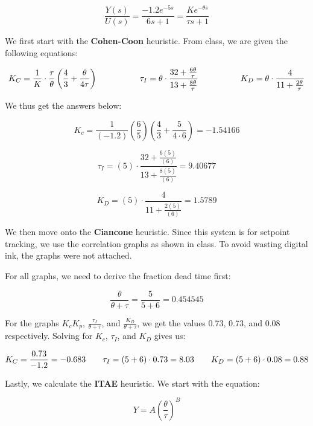 \documentclass[12pt]{article}
\begin{document}
\begin{enumerate}
\begin{enumerate}
    \begin{equation}
      \frac{Y(s)}{U(s)} = \frac{-1.2e^{-5s}}{6s + 1} = \frac{Ke^{-\theta s}}{\tau s + 1}
    \end{equation}

    We first start with the \textbf{Cohen-Coon} heuristic. From class, we are given the following equations:

    $$
      K_C = \frac{1}{K} \cdot \frac{\tau}{\theta} \left( \frac{4}{3} + \frac{\theta}{4\tau} \right) \quad \quad \quad \quad \quad
      \tau_I = \theta \cdot \frac{32 + \frac{6\theta}{\tau}}{13 + \frac{8\theta}{\tau}} \quad \quad \quad \quad \quad
      K_D = \theta \cdot \frac{4}{11 + \frac{2\theta}{\tau}} \\
    $$

    We thus get the answers below:

    \[
    K_c = \frac{1}{\left(-1.2\right)} \left( \frac{6}{5} \right) \left( \frac{4}{3} + {\frac{5}{4 \cdot 6}} \right) = -1.54166
    \]

    \[
      \tau_I = \left(5\right) \cdot \frac{32 + \frac{6\left(5\right)}{\left(6\right)}}{13 + \frac{8\left(5\right)}{\left(6\right)}} = 9.40677
    \]

    \[
      K_D = \left(5\right) \cdot \frac{4}{11 + \frac{2\left(5\right)}{\left(6\right)}} = 1.5789
    \]

    We then move onto the \textbf{Ciancone} heuristic. Since this system is for setpoint tracking, we use the correlation graphs as shown in class. To avoid wasting digital ink, the graphs were not attached.

    For all graphs, we need to derive the fraction dead time first:

    \[
      \frac{\theta}{\theta + \tau} = \frac{5}{5 + 6} = 0.454545
    \]

    For the graphs \( K_c K_p \), \( \frac{\tau_I}{\theta + \tau} \), and \( \frac{K_D}{\theta + \tau} \), we get the values 0.73, 0.73, and 0.08 respectively. Solving for \( K_c \), \( \tau_I \), and \( K_D \) gives us:

    $$
      K_C = \frac{0.73}{-1.2} = -0.683 \quad \quad 
      \tau_I = \left(5 + 6\right) \cdot 0.73 = 8.03 \quad \quad
      K_D = \left(5 + 6\right) \cdot 0.08 = 0.88 \\
    $$

    \pagebreak

    Lastly, we calculate the \textbf{ITAE} heuristic. We start with the equation:

    \[
      Y = A\left(\frac{\theta}{\tau}\right)^B
    \]


\end{enumerate}
\end{enumerate}
\end{document}
